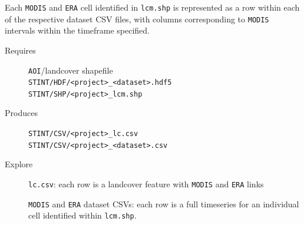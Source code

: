 \documentclass[twoside,a4paper]{refart}
\begin{document}
  Each \texttt{MODIS} and \texttt{ERA} cell identified in \texttt{lcm.shp}
  is represented as a row within 
  each of the respective dataset CSV files, with columns corresponding to \texttt{MODIS} 
  intervals within the timeframe specified.
  
  
  \begin{description}
    \item [Requires]
      \texttt{AOI}/landcover shapefile \\
      \texttt{STINT/HDF/<project>\_<dataset>.hdf5} \\
      \texttt{STINT/SHP/<project>\_lcm.shp}
  
  
    \item [Produces]
      \texttt{STINT/CSV/<project>\_lc.csv} \\
      \texttt{STINT/CSV/<project>\_<dataset>.csv}
      
    \item [Explore]
\texttt{lc.csv}: each row is a landcover feature with \texttt{MODIS} and \texttt{ERA} links
        
\texttt{MODIS} and \texttt{ERA} dataset CSVs: each row is a full timeseries for an
          individual cell identified within \texttt{lcm.shp}.
          
  \end{description}


\end{document}
